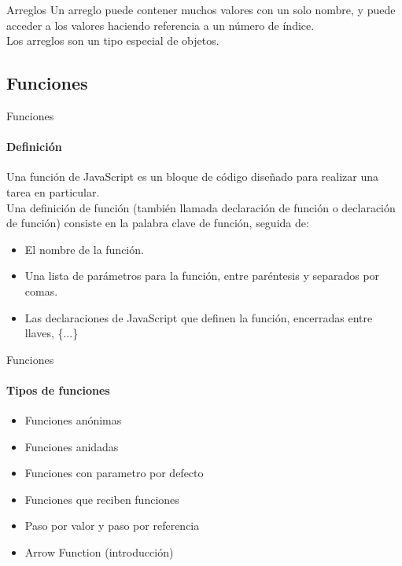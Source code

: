 \documentclass[aspectratio=169]{beamer}
\begin{document}
\begin{darkframes}
\begin{frame}{Arreglos}
      Un arreglo puede contener muchos valores con un solo nombre, y puede acceder a los valores haciendo referencia a un número de índice.\\

      Los arreglos son un tipo especial de objetos. \\

    \end{frame}
    \subsection{Funciones}
    \begin{frame}{Funciones}
      \framesubtitle{Definición}
      Una función de JavaScript es un bloque de código diseñado para realizar una tarea en particular.\\

      Una definición de función (también llamada declaración de función o declaración de función) consiste en la palabra clave de función, seguida de:
      \begin{itemize}
        \item El nombre de la función.
        \item Una lista de parámetros para la función, entre paréntesis y separados por comas.
        \item Las declaraciones de JavaScript que definen la función, encerradas entre llaves, \{...\}
      \end{itemize}
    \end{frame}

    \begin{frame}{Funciones}
      \framesubtitle{Tipos de funciones}
      \begin{itemize}
        \item Funciones anónimas
        \item Funciones anidadas
        \item Funciones con parametro por defecto
        \item Funciones que reciben funciones
        \item Paso por valor y paso por referencia
        \item Arrow Function (introducción)
      \end{itemize}
    \end{frame}


\end{darkframes}
\end{document}
